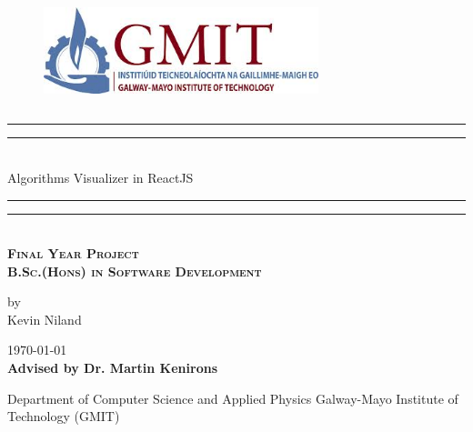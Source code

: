 \documentclass[openany]{report}
\newcommand*{\customTitle}{\begingroup 
\centering 
\vspace*{\baselineskip} 

\rule{\textwidth}{1.6pt}\vspace*{-\baselineskip}\vspace*{2pt} 
\rule{\textwidth}{0.4pt}\\[\baselineskip]

{\Large Algorithms Visualizer in ReactJS}\\[0.2\baselineskip] 

\rule{\textwidth}{0.4pt}\vspace*{-\baselineskip}\vspace{3.2pt} 
\rule{\textwidth}{1.6pt}\\[\baselineskip] 
\scshape 
\Large \textbf{Final Year Project}\\
\textbf{B.Sc.(Hons) in Software Development}\par
\normalsize
\vspace*{2\baselineskip} 

{by \\ Kevin Niland \par} 

\vspace*{2\baselineskip}
\vfill 
{\scshape \today} \\[0.3\baselineskip]

{\textbf{Advised by Dr. Martin Kenirons}}\par 
{Department of Computer Science and Applied Physics Galway-Mayo Institute of Technology (GMIT)}\par

\endgroup}
\begin{document}
 
\begin{figure}
\begin{center}
    \includegraphics[width=8cm,height=3.3cm,keepaspectratio]{images/gmit-logo} 
\end{center}
\end{figure}
\customTitle
\tableofcontents
{} 










\end{document}
